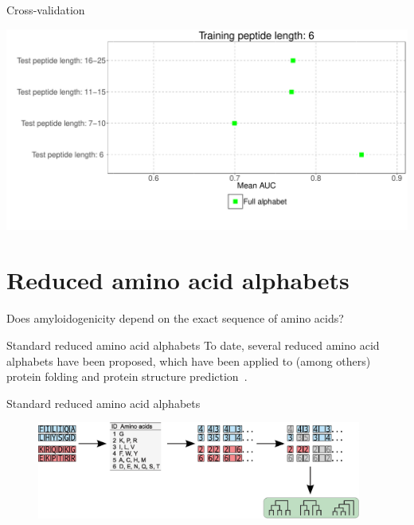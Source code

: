 \documentclass{beamer}\usepackage[]{graphicx}\usepackage[]{color}
\makeatletter
\def\maxwidth{ %
  \ifdim\Gin@nat@width>\linewidth
    \linewidth
  \else
    \Gin@nat@width
  \fi
}
\newenvironment{knitrout}{}{} %
\makeatother
\begin{document}
\begin{frame}{Cross-validation}
\begin{knitrout}
\color{fgcolor}

{\centering \includegraphics[width=\maxwidth]{figure/unnamed-chunk-1-1} 

}



\end{knitrout}
\end{frame}

\section{Reduced amino acid alphabets}
  
\begin{frame}
  Does amyloidogenicity depend on the exact sequence of amino acids?
  \end{frame}

\begin{frame}{Standard reduced amino acid alphabets}
To date, several reduced amino acid alphabets have been proposed, which have been applied to (among others) protein folding and protein structure prediction~\citep{kosiol_new_2004, melo_accuracy_2006}.
  \end{frame}
  
    \begin{frame}{Standard reduced amino acid alphabets}
\begin{figure} 
\includegraphics[width=0.95\textwidth]{static_figure/ngram2.eps}
\end{figure}


  \end{frame}
\end{document}
